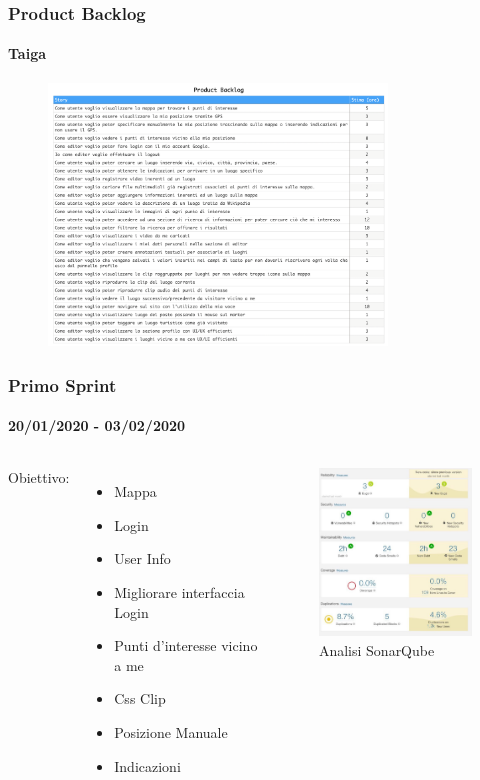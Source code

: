 \documentclass{beamer}
\begin{document}
\begin{frame}
\frametitle{Product Backlog}
\framesubtitle{Taiga}	   
  \begin{figure}[h]
  	\centering 
        \includegraphics[width=9cm]{Images/Taiga/UserStory/backlog.png}
   \end{figure}
\end{frame}

\begin{frame}
\frametitle{Primo Sprint}
\framesubtitle{20/01/2020 - 03/02/2020}
\begin{columns}
Obiettivo: 
  \begin{itemize}
	\item Mappa
	\item Login
	\item User Info
	\item Migliorare interfaccia Login
	\item Punti d'interesse vicino a me
	\item Css Clip
	\item Posizione Manuale
	\item Indicazioni
  \end{itemize}
  \centering  
  \begin{figure}[h]
        \includegraphics[width=5cm]{Images/SonarQube/primo-sprint.png}
        \caption{Analisi SonarQube}
   \end{figure}
\end{columns}
\end{frame}
\end{document}

